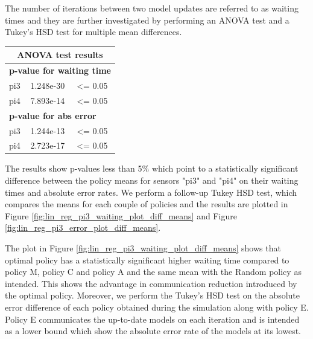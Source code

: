 \documentclass{mpaper}
\begin{document}
The number of iterations between two model updates are referred to as waiting times and they are further investigated by performing an ANOVA test and a Tukey's HSD test for multiple mean differences. 

\begin{table}[h]
\centering
\begin{tabular}{|l|l|l|}
\hline
\multicolumn{3}{|c|}{\cellcolor[HTML]{DAE8FC}\textbf{ANOVA test results}}       \\ \hline
\multicolumn{3}{|l|}{\cellcolor[HTML]{FFFFFF}\textbf{p-value for waiting time}} \\ \hline
pi3           & 1.248e-30         & \textless{}= 0.05                           \\ \hline
pi4           & 7.893e-14         & \textless{}= 0.05                           \\ \hline
\multicolumn{3}{|l|}{\cellcolor[HTML]{FFFFFF}\textbf{p-value for abs error}}    \\ \hline
pi3           & 1.244e-13         & \textless{}= 0.05                           \\ \hline
pi4           & 2.723e-17         & \cellcolor[HTML]{FFFFFF}\textless{}= 0.05   \\ \hline
\end{tabular}
\end{table}

The results show p-values less than 5\% which point to a statistically significant difference between the policy means for sensors "pi3" and "pi4" on their waiting times and absolute error rates. We perform a follow-up Tukey HSD test, which compares the means for each couple of policies and the results are plotted in Figure \ref{fig:lin_reg_pi3_waiting_plot_diff_means} and Figure \ref{fig:lin_reg_pi3_error_plot_diff_means}.

The plot in Figure \ref{fig:lin_reg_pi3_waiting_plot_diff_means} shows that optimal policy has a statistically significant higher waiting time compared to policy M, policy C and policy A and the same mean with the Random policy as intended.
This shows the advantage in communication reduction introduced by the optimal policy.
Moreover, we perform the Tukey's HSD test on the absolute error difference of each policy obtained during the simulation along with policy E. Policy E communicates the up-to-date models on each iteration and is intended as a lower bound which show the absolute error rate of the models at its lowest. 
\end{document}
